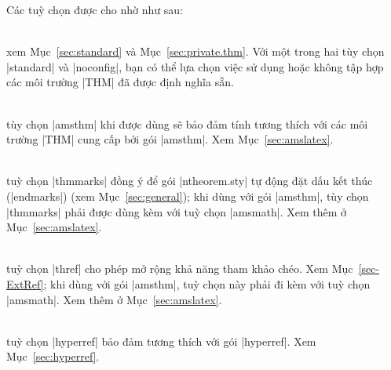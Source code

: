 \medskip
Các tuỳ chọn được cho nhờ  như sau: %
\begin{description}
\item{} \\
	xem Mục~\vref{sec:standard} và Mục~\vref{sec:private.thm}.
	Với một trong hai tùy chọn |standard| và |noconfig|,
	bạn có thể lựa chọn việc sử dụng hoặc không tập hợp
	các môi trường |THM| đã được định nghĩa sẵn.
\item{}\\
	tùy chọn |amsthm| khi được dùng sẽ bảo đảm tính tương thích với các môi trường
	|THM| cung cấp bởi gói |amsthm|. Xem Mục~\vref{sec:amslatex}.
\item{}\\
	tuỳ chọn |thmmarks| đồng ý để gói |ntheorem.sty| tự động đặt dấu kết thúc
	(|endmarks|) (xem Mục~\ref{sec:general}); khi dùng với gói |amsthm|,
	tùy chọn |thmmarks| phải được dùng kèm với tuỳ chọn |amsmath|.
	Xem thêm ở Mục~\ref{sec:amslatex}.
\item{}\\
	tuỳ chọn |thref| cho phép mở rộng khả năng tham khảo chéo. Xem Mục~\vref{sec-ExtRef};
	khi dùng với gói |amsthm|, tuỳ chọn này phải đi kèm với tuỳ chọn |amsmath|.
	Xem thêm ở Mục~\ref{sec:amslatex}.
\item{}\\
	tuỳ chọn |hyperref| bảo đảm tương thích với gói |hyperref|.
	Xem Mục~\vref{sec:hyperref}.
\end{description}

